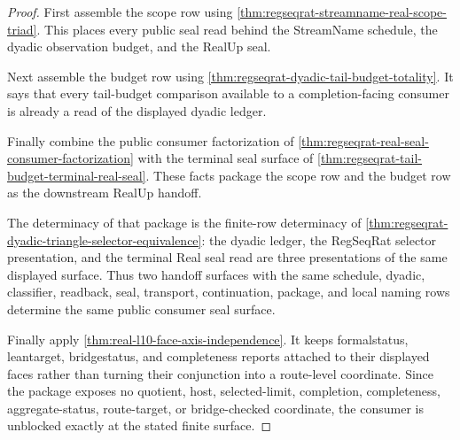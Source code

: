 \begin{proof}
First assemble the scope row using
\autoref{thm:regseqrat-streamname-real-scope-triad}. This places every public
seal read behind the StreamName schedule, the dyadic observation budget, and
the RealUp seal.

Next assemble the budget row using
\autoref{thm:regseqrat-dyadic-tail-budget-totality}. It says that every
tail-budget comparison available to a completion-facing consumer is already a
read of the displayed dyadic ledger.

Finally combine the public consumer factorization of
\autoref{thm:regseqrat-real-seal-consumer-factorization} with the terminal
seal surface of \autoref{thm:regseqrat-tail-budget-terminal-real-seal}. These
facts package the scope row and the budget row as the downstream RealUp
handoff.

The determinacy of that package is the finite-row determinacy of
\autoref{thm:regseqrat-dyadic-triangle-selector-equivalence}: the dyadic
ledger, the RegSeqRat selector presentation, and the terminal Real seal read
are three presentations of the same displayed surface. Thus two handoff
surfaces with the same schedule, dyadic, classifier, readback, seal,
transport, continuation, package, and local naming rows determine the same
public consumer seal surface.

Finally apply \autoref{thm:real-l10-face-axis-independence}. It keeps
formalstatus, leantarget, bridgestatus, and completeness reports attached to
their displayed faces rather than turning their conjunction into a route-level
coordinate. Since the package exposes no quotient, host, selected-limit,
completion, completeness, aggregate-status, route-target, or bridge-checked
coordinate, the consumer is unblocked exactly at the stated finite surface.
\end{proof}


